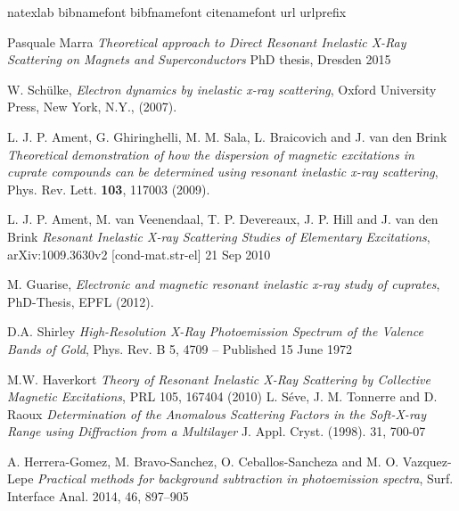 \documentclass[twocolumn,amsmath,superscriptaddress,amssymb]{revtex4-1}
\begin{document}
\begin{thebibliography}
\expandafter\ifx\csname natexlab\endcsname\relax\def\natexlab#1{#1}\fi
\expandafter\ifx\csname bibnamefont\endcsname\relax
  \def\bibnamefont#1{#1}\fi
\expandafter\ifx\csname bibfnamefont\endcsname\relax
  \def\bibfnamefont#1{#1}\fi
\expandafter\ifx\csname citenamefont\endcsname\relax
  \def\citenamefont#1{#1}\fi
\expandafter\ifx\csname url\endcsname\relax
  \def\url#1{\texttt{#1}}\fi
\expandafter\ifx\csname urlprefix\endcsname\relax\def\urlprefix{URL }\fi
\providecommand{\bibinfo}[2]{#2}
\providecommand{\eprint}[2][]{\url{#2}}


Pasquale Marra
\textit{Theoretical approach to Direct Resonant Inelastic X-Ray Scattering on Magnets and Superconductors}
PhD thesis, Dresden 2015

W. Sch\"{u}lke,
\textit{Electron dynamics by inelastic x-ray scattering},
Oxford University Press, New York, N.Y., (2007).

L. J. P. Ament, G. Ghiringhelli, M. M. Sala, L. Braicovich and J. van den Brink
\textit{Theoretical demonstration of how the dispersion of magnetic excitations in cuprate compounds can be determined using resonant inelastic x-ray scattering},
Phys. Rev. Lett. {\bf103}, 117003 (2009).

L. J. P. Ament, M. van Veenendaal, T. P. Devereaux, J. P. Hill and J. van den Brink
\textit{Resonant Inelastic X-ray Scattering Studies of Elementary Excitations},
arXiv:1009.3630v2 [cond-mat.str-el] 21 Sep 2010

M. Guarise,
\textit{Electronic and magnetic resonant inelastic x-ray study of cuprates},
PhD-Thesis, EPFL (2012).

D.A. Shirley
\textit{High-Resolution X-Ray Photoemission Spectrum of the Valence Bands of Gold},
Phys. Rev. B 5, 4709 – Published 15 June 1972

M.W. Haverkort
\textit{Theory of Resonant Inelastic X-Ray Scattering by Collective Magnetic Excitations},
PRL 105, 167404 (2010)
L. S\'{e}ve, J. M. Tonnerre and D. Raoux
\textit{Determination of the Anomalous Scattering Factors in the Soft-X-ray Range using Diffraction from a Multilayer}
J. Appl. Cryst. (1998). 31, 700-07

A. Herrera-Gomez, M. Bravo-Sanchez, O. Ceballos-Sancheza and M. O. Vazquez-Lepe
\textit{Practical methods for background subtraction in photoemission spectra},
Surf. Interface Anal. 2014, 46, 897–905


\end{thebibliography}
\end{document}
